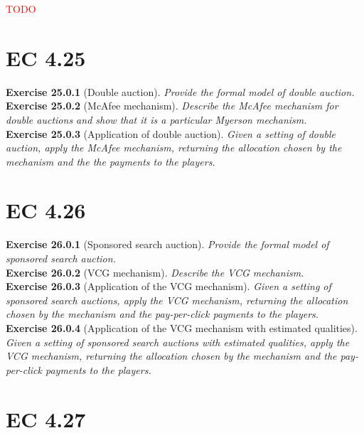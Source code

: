 \textcolor{red}{TODO}\\

\section{EC 4.25}

\textbf{Exercise 25.0.1} (Double auction). \textit{Provide the formal model of double auction.}\\

\textbf{Exercise 25.0.2} (McAfee mechanism). \textit{Describe the McAfee mechanism for double auctions and show that it is a particular Myerson mechanism.}\\

\textbf{Exercise 25.0.3} (Application of double auction). \textit{Given a setting of double auction, apply the McAfee mechanism, returning the allocation chosen by the mechanism and the the payments to the players.}

\section{EC 4.26}

\textbf{Exercise 26.0.1} (Sponsored search auction). \textit{Provide the formal model of sponsored search auction.}\\

\textbf{Exercise 26.0.2} (VCG mechanism). \textit{Describe the VCG mechanism.}\\

\textbf{Exercise 26.0.3} (Application of the VCG mechanism). \textit{Given a setting of sponsored search auctions, apply the VCG mechanism, returning the allocation chosen by the mechanism and the pay-per-click payments to the players.}\\

\textbf{Exercise 26.0.4} (Application of the VCG mechanism with estimated qualities). \textit{Given a setting of sponsored search auctions with estimated qualities, apply the VCG mechanism, returning the allocation chosen by the mechanism and the pay-per-click payments to the players.}\\

\section{EC 4.27}

